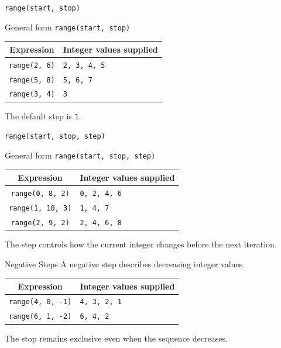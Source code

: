 \documentclass[aspectratio=169,10pt]{beamer}
\begin{document}
\begin{frame}{\texttt{range(start, stop)}}
  \begin{block}{General form}
    \texttt{range(start, stop)}
  \end{block}

  \begin{center}
    \renewcommand{\arraystretch}{1.25}
    \begin{tabular}{c|l}
      \textbf{Expression} & \textbf{Integer values supplied} \\\hline
      \texttt{range(2, 6)} & \texttt{2, 3, 4, 5} \\
      \texttt{range(5, 8)} & \texttt{5, 6, 7} \\
      \texttt{range(3, 4)} & \texttt{3}
    \end{tabular}
  \end{center}

  The default step is \texttt{1}.
\end{frame}

\begin{frame}{\texttt{range(start, stop, step)}}
  \begin{block}{General form}
    \texttt{range(start, stop, step)}
  \end{block}

  \begin{center}
    \renewcommand{\arraystretch}{1.25}
    \begin{tabular}{c|l}
      \textbf{Expression} & \textbf{Integer values supplied} \\\hline
      \texttt{range(0, 8, 2)} & \texttt{0, 2, 4, 6} \\
      \texttt{range(1, 10, 3)} & \texttt{1, 4, 7} \\
      \texttt{range(2, 9, 2)} & \texttt{2, 4, 6, 8}
    \end{tabular}
  \end{center}

  \begin{keyidea}
    The step controls how the current integer changes before the next iteration.
  \end{keyidea}
\end{frame}

\begin{frame}{Negative Steps}
  A negative step describes decreasing integer values.

  \begin{center}
    \renewcommand{\arraystretch}{1.25}
    \begin{tabular}{c|l}
      \textbf{Expression} & \textbf{Integer values supplied} \\\hline
      \texttt{range(4, 0, -1)} & \texttt{4, 3, 2, 1} \\
      \texttt{range(6, 1, -2)} & \texttt{6, 4, 2}
    \end{tabular}
  \end{center}

  The stop remains exclusive even when the sequence decreases.
\end{frame}
\end{document}
